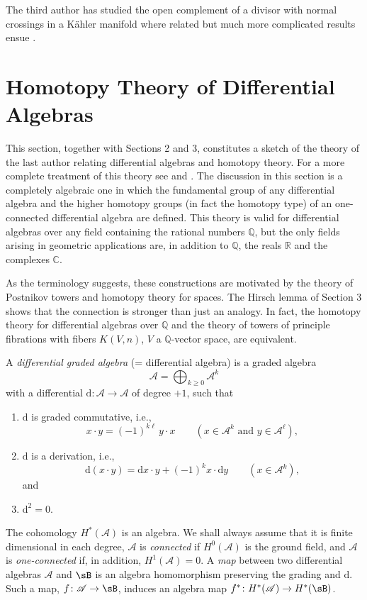 \documentclass[11pt]{amsart}
\theoremstyle{plain}
\theoremstyle{definition}
\newcommand{\sA}{\mathscr{A}}
\newcommand{\dd}{\mathrm{d}}
\newcommand{\CC}{\mathbb{C}}
\newcommand{\RR}{\mathbb{R}}
\newcommand{\QQ}{\mathbb{Q}}
\begin{document}
The third author has studied the open complement of a divisor with normal crossings in a K\"ahler manifold where related but much more complicated results ensue \cite{M2}.


\section{Homotopy Theory of Differential Algebras}

This section, together with Sections 2 and 3, constitutes a sketch of the theory of the last author relating differential algebras and homotopy theory. For a more complete treatment of this theory see \cite{FGM,S1,Q} and \cite{S2}. The discussion in this section is a completely algebraic one in which the fundamental group of any differential algebra and the higher homotopy groups (in fact the homotopy type) of an one-connected differential algebra are defined. This theory is valid for differential algebras over any field containing the rational numbers $\QQ$, but the only fields arising in geometric applications are, in addition to $\QQ$, the reals $\RR$ and the complexes $\CC$.

As the terminology suggests, these constructions are motivated by the theory of Postnikov towers and homotopy theory for spaces. The Hirsch lemma of Section 3 shows that the connection is stronger than just an analogy. In fact, the homotopy theory for differential algebras over $\QQ$ and the theory of towers of principle fibrations with fibers $K(V,n)$, $V$ a $\QQ$-vector space, are equivalent.

A \emph{differential graded algebra} (= differential algebra) is a graded algebra
\[
\sA = \bigoplus_{k \ge 0} \sA^{k}
\]
with a differential $\dd \colon \sA \to \sA$ of degree $+1$, such that
\begin{enumerate}
\item $\dd$ is graded commutative, i.e.,
\[
x \cdot y = (-1)^{k\ell}\, y \cdot x \qquad (x \in \sA^{k} \text{ and } y \in \sA^{\ell}),
\]
\item $\dd$ is a derivation, i.e.,
\[
\dd(x \cdot y) = \dd x \cdot y + (-1)^{k} x \cdot \dd y \qquad (x \in \sA^{k}),
\]
and
\item $\dd^{2} = 0$.
\end{enumerate}

The cohomology $H^{*}(\sA)$ is an algebra. We shall always assume that it is finite dimensional in each degree, $\sA$ is \emph{connected} if $H^{0}(\sA)$ is the ground field, and $\sA$ is \emph{one-connected} if, in addition, $H^{1}(\sA) = 0$. A \emph{map} between two differential algebras $\sA$ and $\sB$ is an algebra homomorphism preserving the grading and $\dd$. Such a map, $f \colon \sA \to \sB$, induces an algebra map $f^{*} \colon H^{*}(\sA) \to H^{*}(\sB)$.
\end{document}
